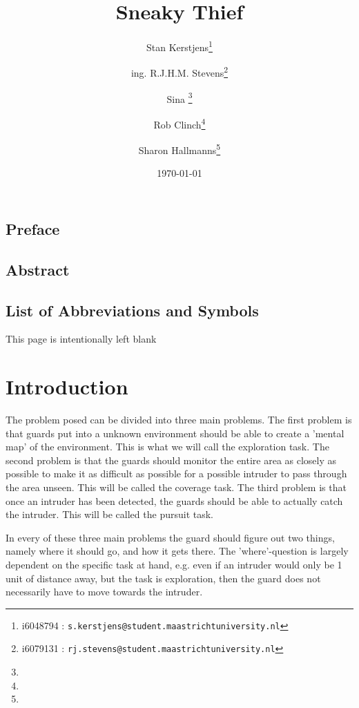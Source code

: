 \documentclass{report}
\title{Sneaky Thief}
\author{Stan Kerstjens\thanks{i6048794 : \texttt{s.kerstjens@student.maastrichtuniversity.nl}}}
\author{ing. R.J.H.M. Stevens\thanks{i6079131 : \texttt{rj.stevens@student.maastrichtuniversity.nl}}} %
\author{Sina \thanks{}} %
\author{Rob Clinch\thanks{}}
\author{Sharon Hallmanns\thanks{}} %
\affil{Department of Knowledge Engineering, Maastricht University}
\date{\today}
\begin{document}
\maketitle

\section*{Preface}
\section*{Abstract}
\listoffigures
\section*{List of Abbreviations and Symbols}
\tableofcontents\newpage



\newpage
\begin{center} 
	This page is intentionally left blank 
\end{center}

\newpage

\chapter{Introduction}




	The problem posed can be divided into three main problems. The first problem is that guards put into a unknown environment should be able to create a 'mental map' of the environment. This is what we will call the exploration task. The second problem is that the guards should monitor the entire area as closely as possible to make it as difficult as possible for a possible intruder to pass through the area unseen. This will be called the coverage task. The third problem is that once an intruder has been detected, the guards should be able to actually catch the intruder. This will be called the pursuit task.

	In every of these three main problems the guard should figure out two things, namely where it should go, and how it gets there. The 'where'-question is largely dependent on the specific task at hand, e.g. even if an intruder would only be 1 unit of distance away, but the task is exploration, then the guard does not necessarily have to move towards the intruder.
\end{document}
